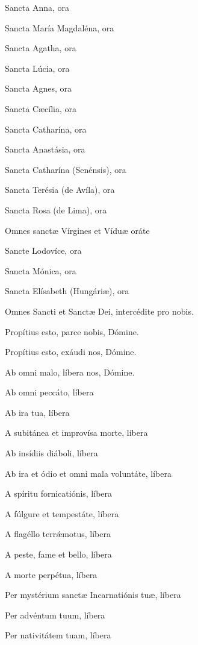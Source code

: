 \documentclass[12pt,a6paper]{book}
\begin{document}
\begin{sloppy}
\vspace{3mm}

Sancta Anna, ora

Sancta María Magdaléna, ora

Sancta Agatha, ora

Sancta Lúcia, ora

Sancta Agnes, ora

Sancta Cæcília, ora

Sancta Catharína, ora

Sancta Anastásia, ora

Sancta Catharína (Senénsis), ora

Sancta Terésia (de Avíla), ora

Sancta Rosa (de Lima), ora

Omnes sanctæ Vírgines et Víduæ oráte

\vspace{3mm}

Sancte Lodovíce, ora

Sancta Mónica, ora

Sancta Elísabeth (Hungáriæ), ora

Omnes Sancti et Sanctæ Dei, intercédite pro nobis.

\vspace{3mm}

Propítius esto, parce nobis, Dómine.

Propítius esto, exáudi nos, Dómine.

\vspace{3mm}

Ab omni malo, líbera nos, Dómine.

Ab omni peccáto, líbera

Ab ira tua, líbera

A subitánea et improvísa morte, líbera

Ab insídiis diáboli, líbera

Ab ira et ódio et omni mala voluntáte, líbera

A spíritu fornicatiónis, líbera

A fúlgure et tempestáte, líbera

A flagéllo terrǽmotus, líbera

A peste, fame et bello, líbera

A morte perpétua, líbera

Per mystérium sanctæ Incarnatiónis tuæ, líbera

Per advéntum tuum, líbera

Per nativitátem tuam, líbera


\end{sloppy}
\end{document}
